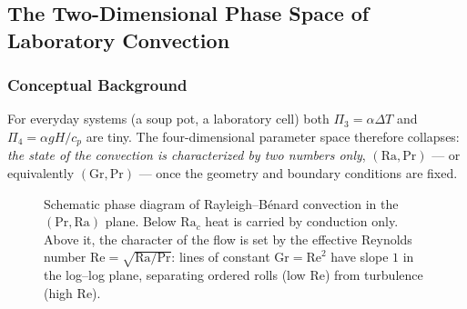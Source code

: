 \subsection{The Two-Dimensional Phase Space of Laboratory Convection}
\label{sec:lec09:phase-space}

\subsubsection*{Conceptual Background}
For everyday systems (a soup pot, a laboratory cell) both $\Pi_3=\alpha\Delta
T$ and $\Pi_4=\alpha gH/c_p$ are tiny. The four-dimensional parameter space
therefore collapses: \emph{the state of the convection is characterized by two
numbers only}, $(\mathrm{Ra},\mathrm{Pr})$ --- or equivalently
$(\mathrm{Gr},\mathrm{Pr})$ --- once the geometry and boundary conditions are
fixed.

\begin{figure}[ht]
    \centering
    \caption{Schematic phase diagram of Rayleigh--B\'enard convection in the
    $(\mathrm{Pr},\mathrm{Ra})$ plane. Below $\mathrm{Ra}_c$ heat is carried
    by conduction only. Above it, the character of the flow is set by the
    effective Reynolds number $\mathrm{Re}=\sqrt{\mathrm{Ra}/\mathrm{Pr}}$:
    lines of constant $\mathrm{Gr}=\mathrm{Re}^2$ have slope $1$ in the
    log--log plane, separating ordered rolls (low $\mathrm{Re}$) from
    turbulence (high $\mathrm{Re}$).}
    \label{fig:lec09:phase-diagram}
\end{figure}


